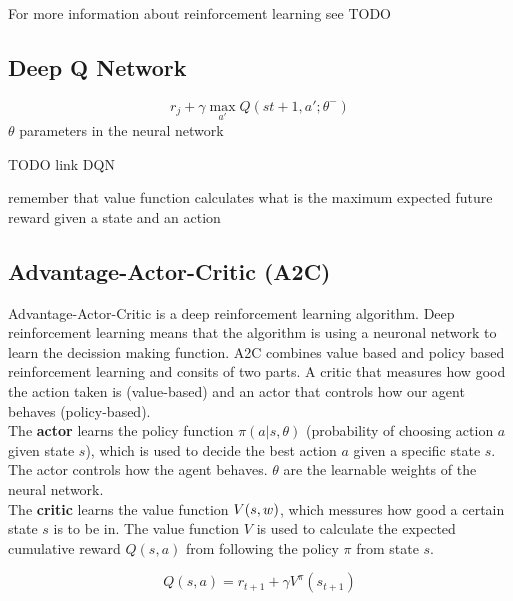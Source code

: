 
For more information about reinforcement learning see TODO


\subsection{Deep Q Network}

\begin{equation}
r_j + \gamma \max_{a'} Q(s{t+1}, a'; \theta^-)
\end{equation}
$\theta$ parameters in the neural network

TODO link DQN


remember that value function calculates what is the maximum expected future reward given a state and an action
\subsection{Advantage-Actor-Critic (A2C)}

Advantage-Actor-Critic is a deep reinforcement learning algorithm. Deep reinforcement learning means that the algorithm is using a neuronal network to learn the decission making function. A2C combines value based and policy based reinforcement learning and consits of two parts. A critic that measures how good the action taken is (value-based) and an actor that controls how our agent behaves (policy-based).\\

The \textbf{actor} learns the policy function $\pi(a | s, \theta)$ (probability of choosing action $a$ given state $s$), which is used to decide the best action $a$ given a specific state $s$.
The actor controls how the agent behaves.
$\theta$ are the learnable weights of the neural network. \\

The \textbf{critic} learns the value function $\mathnormal{V(s, w)}$, which messures how good a certain state $s$ is to be in. The value function $V$ is used to calculate the expected cumulative reward $Q(s, a)$ from following the policy $\pi$ from state $s$.

\begin{equation}
	Q(s, a) = r_{t+1} + \gamma V^\pi(s_{t+1})
\end{equation}

